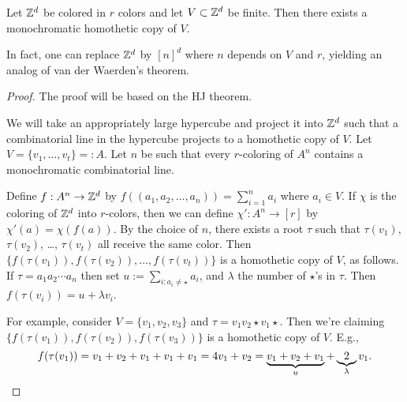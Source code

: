 \begin{theorem}
Let $\mathbb{Z}^d$ be colored in $r$ colors and let $V\subset \mathbb{Z}^d$ be finite. Then there exists a monochromatic homothetic copy of $V$.
\end{theorem}
\begin{remark}
In fact, one can replace $\mathbb{Z}^d$ by $[n]^d$ where $n$ depends on $V$ and $r$, yielding an analog of van der Waerden's theorem.
\end{remark}
\begin{proof}	
The proof will be based on the  HJ theorem.

We will take an appropriately large hypercube and project it into $\mathbb{Z}^d$ such that a combinatorial line in the hypercube projects to a homothetic copy of $V$.
Let $V = \{v_1,\dotsc,v_t\} =: A$. Let $n$ be such that every $r$-coloring of $A^n$ contains a monochromatic combinatorial line.

Define $f: A^n\to \mathbb{Z}^d$ by $f((a_1,a_2,\dotsc,a_n)) = \sum_{i=1}^n a_i$ where $a_i \in V$. If $\chi$ is the coloring of $\mathbb{Z}^d$ into $r$-colors, then we can define $\chi': A^n \to [r]$ by $\chi'(a) = \chi(f(a))$. By the choice of $n$, there exists a root $\tau$ such that $\tau(v_1)$, $\tau(v_2)$, \ldots, $\tau(v_t)$ all receive the same color. Then $\{f(\tau(v_1)), f(\tau(v_2)), \ldots,f( \tau(v_t))\}$ is a homothetic copy of $V$, as follows. If $\tau = a_1a_2\dotsm a_n$ then set  $u := \sum_{i: a_i\neq \star} a_i$, and $\lambda$  the number of $\star$'s in $\tau$. Then $f(\tau(v_i)) = u+ \lambda v_i$.


For example, consider $V=\{v_1,v_2,v_3\}$ and $\tau= v_1 v_2 \star v_1 \star$. Then we're claiming $\{f(\tau(v_1)),f(\tau(v_2)),f(\tau(v_3))\}$ is a homothetic copy of $V$. E.g.,
\[
f(\tau(v_1)) =  v_1 + v_2 + v_1  +v_1 + v_1 =4v_1  + v_2 = \underbrace{v_1+v_2 +v_1}_{u} + \underbrace{2}_\lambda v_1. \qedhere
\]
\end{proof}


